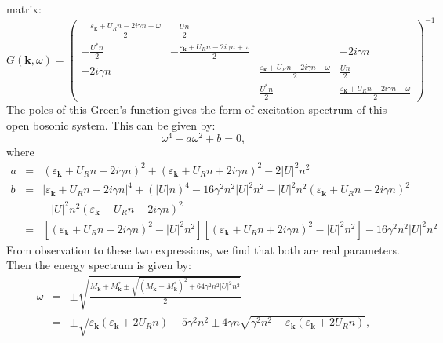 \documentclass[aps,onecolumn,superscriptaddress,notitlepage,longbibliography]{revtex4-1}
\begin{document}
matrix:
\begin{equation}
  G (\mathbf{k}, \omega) = \left(\begin{array}{cccc}
    - \frac{\varepsilon_{\mathbf{k}} + U_R n - 2 i \gamma n - \omega}{2} & -
    \frac{U n}{2} &  & \\
    - \frac{U^{\ast} n}{2} & - \frac{\varepsilon_{\mathbf{k}} + U_R n - 2 i
    \gamma n + \omega}{2} &  & - 2 i \gamma n\\
    - 2 i \gamma n &  & \frac{\varepsilon_{\mathbf{k}} + U_R n + 2 i \gamma
    n - \omega}{2} & \frac{U n}{2}\\
    &  & \frac{U^{\ast} n}{2} & \frac{\varepsilon_{\mathbf{k}} + U_R n + 2
    i \gamma n + \omega}{2}
  \end{array}\right)^{- 1}
\end{equation}
The poles of this Green's function gives the form of excitation spectrum of
this open bosonic system. This can be given by:
\begin{equation}
  \omega^4 - a \omega^2 + b = 0,
\end{equation}
where
\begin{eqnarray}
  a & = & (\varepsilon_{\mathbf{k}} + U_R n - 2 i \gamma n)^2 +
  (\varepsilon_{\mathbf{k}} + U_R n + 2 i \gamma n)^2 - 2 | U |^2 n^2 \\
  b & = & | \varepsilon_{\mathbf{k}} + U_R n - 2 i \gamma n |^4 + (| U |
  n)^4 - 16 \gamma^2 n^2 | U |^2 n^2 - | U |^2 n^2 (\varepsilon_{\mathbf{k}}
  + U_R n - 2 i \gamma n)^2 \nonumber\\
  &  & - | U |^2 n^2 (\varepsilon_{\mathbf{k}} + U_R n - 2 i \gamma n)^2
  \nonumber\\
  & = & [(\varepsilon_{\mathbf{k}} + U_R n - 2 i \gamma n)^2 - | U |^2 n^2]
  [(\varepsilon_{\mathbf{k}} + U_R n + 2 i \gamma n)^2 - | U |^2 n^2] - 16
  \gamma^2 n^2 | U |^2 n^2 
\end{eqnarray}
From observation to these two expressions, we find that both are real
parameters. Then the energy spectrum is given by:
\begin{eqnarray}\label{spectrum_imaginary}
  \omega & = & \pm \sqrt{\frac{M_{\mathbf{k}} + M_{\mathbf{k}}^{\ast} \pm
  \sqrt{(M_{\mathbf{k}} - M_{\mathbf{k}}^{\ast})^2 + 64 \gamma^2 n^2 | U
  |^2 n^2}}{2}} \nonumber\\
  & = & \pm \sqrt{\varepsilon_{\mathbf{k}} (\varepsilon_{\mathbf{k}} + 2
  U_R n) - 5 \gamma^2 n^2 \pm 4 \gamma n \sqrt{\gamma^2 n^2 -
  \varepsilon_{\mathbf{k}} (\varepsilon_{\mathbf{k}} + 2 U_R n)}},
\end{eqnarray}
\end{document}
